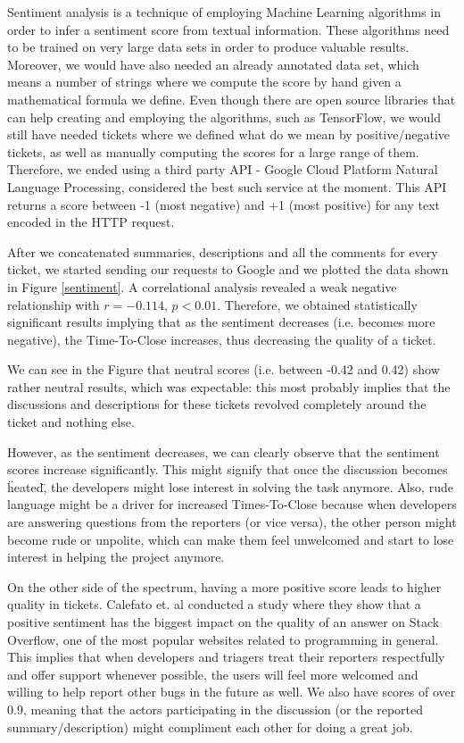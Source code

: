 \documentclass{mpaper}
\begin{document}
Sentiment analysis is a technique of employing Machine Learning algorithms in order to infer a sentiment 
score from textual information. These algorithms need to be trained on very large data sets in order to 
produce valuable results. Moreover, we would have also needed an already annotated data set, which means 
a number of strings where we compute the score by hand given a mathematical formula we define. Even though 
there are open source libraries that can help creating and employing the algorithms, such as TensorFlow, 
we would still have needed tickets where we defined what do we mean by positive/negative tickets, as well as
manually computing the scores for a large range of them. Therefore, we ended using a third party API - Google 
Cloud Platform Natural Language Processing, considered the best such service at the moment. This API returns 
a score between -1 (most negative) and +1 (most positive) for any text encoded in the HTTP request.

After we concatenated summaries, descriptions and all the comments for every ticket, we started sending our 
requests to Google and we plotted the data shown in Figure \ref{sentiment}. A correlational analysis revealed a 
weak negative relationship with $r = -0.114$, $p < 0.01$. Therefore, we obtained statistically significant 
results implying that as the sentiment decreases (i.e. becomes more negative), the Time-To-Close increases, thus 
decreasing the quality of a ticket.

We can see in the Figure that neutral scores (i.e. between -0.42 and 0.42) show rather neutral results, which 
was expectable: this most probably implies that the discussions and descriptions for these tickets revolved 
completely around the ticket and nothing else. 

However, as the sentiment decreases, we can clearly observe that the sentiment scores increase significantly. 
This might signify that once the discussion becomes \"heated\", the developers might lose interest in solving 
the task anymore. Also, rude language might be a driver for increased Times-To-Close because when developers are 
answering questions from the reporters (or vice versa), the other person might become rude or unpolite, which can 
make them feel unwelcomed and start to lose interest in helping the project anymore. 

On the other side of the spectrum, having a more positive score leads to higher quality in tickets. Calefato et. al 
\cite{calefato2015mining} conducted a study where they show that a positive sentiment has the biggest impact on 
the quality of an answer on Stack Overflow, one of the most popular websites related to programming in general. This 
implies that when developers and triagers treat their reporters respectfully and offer support whenever possible, 
the users will feel more welcomed and willing to help report other bugs in the future as well. We also have scores of 
over 0.9, meaning that the actors participating in the discussion (or the reported summary/description) might compliment 
each other for doing a great job.
\end{document}
